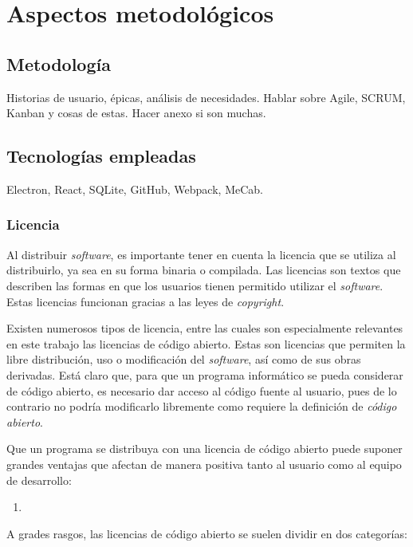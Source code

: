 \chapter{Aspectos metodológicos}  

\section{Metodología}

Historias de usuario, épicas, análisis de necesidades. Hablar sobre Agile, SCRUM, Kanban y cosas de estas.
Hacer anexo si son muchas.

\section{Tecnologías empleadas}

Electron, React, SQLite, GitHub, Webpack, MeCab.

\subsection{Licencia}

Al distribuir \textit{software}, es importante tener en cuenta la licencia que se utiliza al distribuirlo, ya sea en su forma binaria o compilada. Las licencias son textos que describen las formas en que los usuarios tienen permitido utilizar el \textit{software}. Estas licencias funcionan gracias a las leyes de \textit{copyright}.

Existen numerosos tipos de licencia, entre las cuales son especialmente relevantes en este trabajo las licencias de código abierto. Estas son licencias que permiten la libre distribución, uso o modificación del \textit{software}, así como de sus obras derivadas. Está claro que, para que un programa informático se pueda considerar de código abierto, es necesario dar acceso al código fuente al usuario, pues de lo contrario no podría modificarlo libremente como requiere la definición de \textit{código abierto}.

Que un programa se distribuya con una licencia de código abierto puede suponer grandes ventajas que afectan de manera positiva tanto al usuario como al equipo de desarrollo:

\begin{enumerate}
	\item 
\end{enumerate}

A grades rasgos, las licencias de código abierto se suelen dividir en dos categorías:


